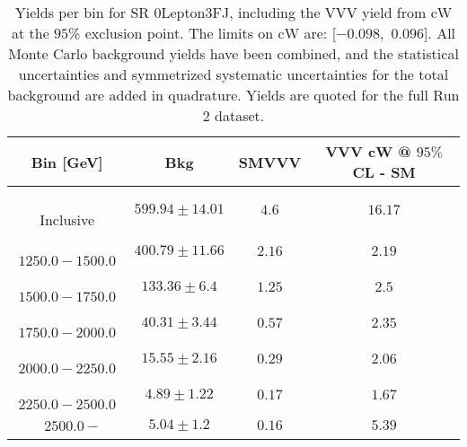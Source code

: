 \begin{table}[!htbp]
    \small
    \center
    \begin{tabular}{c||c|c|c}
    Bin [GeV] & Bkg & SMVVV & \pbox{20cm}{VVV \\ cW @ $95\%$ CL - SM \\ }\\
    \hline
    \pbox{20cm}{ ~ \\Inclusive\\ } & $599.94 \pm 14.01$ & $4.6$ & $16.17$\\
    \hline
    \pbox{20cm}{ ~ \\$1250.0-1500.0$\\ } & $400.79 \pm 11.66$ & $2.16$ & $2.19$\\
    \hline
    \pbox{20cm}{ ~ \\$1500.0-1750.0$\\ } & $133.36 \pm 6.4$ & $1.25$ & $2.5$\\
    \hline
    \pbox{20cm}{ ~ \\$1750.0-2000.0$\\ } & $40.31 \pm 3.44$ & $0.57$ & $2.35$\\
    \hline
    \pbox{20cm}{ ~ \\$2000.0-2250.0$\\ } & $15.55 \pm 2.16$ & $0.29$ & $2.06$\\
    \hline
    \pbox{20cm}{ ~ \\$2250.0-2500.0$\\ } & $4.89 \pm 1.22$ & $0.17$ & $1.67$\\
    \hline
    \pbox{20cm}{ ~ \\$2500.0-$\\ } & $5.04 \pm 1.2$ & $0.16$ & $5.39$\\
\end{tabular}
    \caption{Yields per bin for SR 0Lepton3FJ, including the VVV yield from cW at the $95$\% exclusion point. The limits on cW are: [$-0.098$,~$0.096$]. All Monte Carlo background yields have been combined, and the statistical uncertainties and symmetrized systematic uncertainties for the total background are added in quadrature. Yields are quoted for the full Run 2 dataset.}
    \label{tab:0Lepton3FJ$binssignal}
\end{table}

